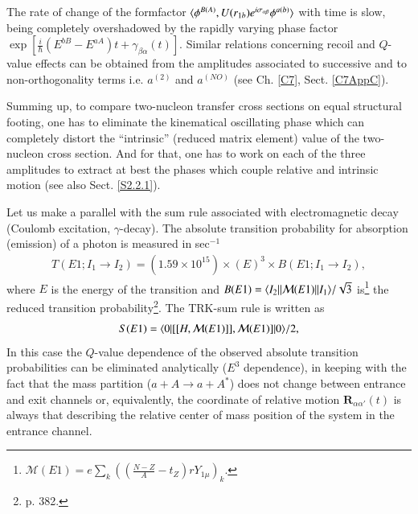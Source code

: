 \begin{subappendices}
 
 The rate of change of the formfactor $\langle {\phi^{B(A)},U(r_{1b})e^{i\sigma_{\alpha\beta}}\phi^{a(b)}} \rangle$ with time is slow, being completely overshadowed by the rapidly varying phase factor\\ $\exp\left[\frac{i}{\hbar}(E^{bB}-E^{aA})t+\gamma_{\beta\alpha}(t)\right]$. Similar relations concerning recoil and $Q$-value effects can be obtained from the amplitudes associated to successive and to non-orthogonality terms i.e. $a^{(2)}$ and $a^{(NO)}$ (see Ch. \ref{C7}, Sect. \ref{C7AppC}).
 
 
 Summing up, to compare two-nucleon transfer cross sections on equal structural footing, one has to eliminate the kinematical oscillating phase which can completely distort the ``intrinsic'' (reduced matrix element) value of the two-nucleon cross section. And for that, one has to work on each of the three amplitudes to extract at best the phases which couple relative and intrinsic motion (see also Sect. \ref{S2.2.1}).
 
 
 
 Let us make a parallel with the sum rule associated with electromagnetic decay (Coulomb excitation, $\gamma$-decay). The absolute transition probability for absorption (emission) of a photon  is measured in sec$^{-1}$ 
 \begin{align}
 T(E1;I_1\to I_2)=\left(1.59\times 10^{15}\right)\times (E)^3\times B(E1;I_1\to I_2),
 \end{align}
 where $E$ is the energy of the transition and $B(E1)=\langle {I_2||\mathcal M(E1)||I_1} \rangle/\sqrt{3}$ is\footnote{$\mathcal M(E1)=e\sum_k\left(\left(\frac{N-Z}{A}-t_Z\right)rY_{1\mu}\right)_k$.} the reduced transition probability\footnote{\cite{Bohr:69} p. 382.}. The TRK-sum rule is written as
 \begin{align}
 S(E1)=\langle {0}|[[H,\mathcal M(E1)]],\mathcal M(E1)]|{0} \rangle/2,
 \end{align}
 In this  case the $Q$-value dependence of the observed absolute transition probabilities can be eliminated analytically ($E^3$ dependence), in keeping with the fact that the mass partition ($a+A\rightarrow a+A^*$)  does not change between entrance and exit channels or, equivalently, the coordinate of relative motion $\mathbf R_{\alpha\alpha'}(t)$ is always that describing the relative center of mass position of the system in the entrance channel. 
 

\end{subappendices}
